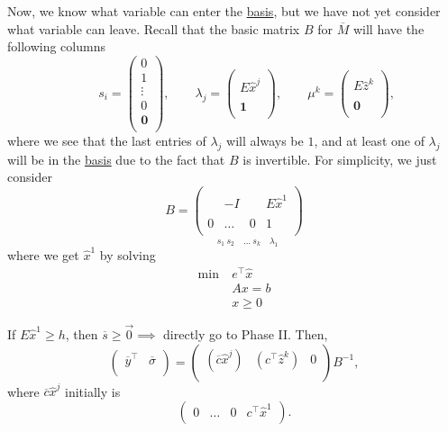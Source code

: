 Now, we know what variable can enter the \hyperref[def:basic]{basis}, but we have not yet consider what variable can leave. Recall that the basic matrix \(B\) for \(\overline{M}\)
will have the following columns
\[
	\qquad s_{i} = \begin{pmatrix}
		0      \\
		1      \\
		\vdots \\
		0      \\
		\bm{0} \\
	\end{pmatrix}, \qquad \lambda_{j} = \begin{pmatrix}
		\\
		E \hat{x}^j \\
		\\
		\bm{1}      \\
	\end{pmatrix}, \qquad \mu^k =\begin{pmatrix}
		\\
		E \hat{z}^k \\
		\\
		\bm{0}      \\
	\end{pmatrix},
\]
where we see that the last entries of \(\lambda_{j}\) will always be \(1\), and at least one of \(\lambda_{j}\) will be in the \hyperref[def:basic]{basis} due to the fact
that \(B\) is invertible. For simplicity, we just consider
\[
	B = \underset{s_1\ s_2\quad \ldots\ s_k\quad \lambda_1}{
		\begin{pmatrix}
			  &        &   &             \\
			  & -I     &   & E \hat{x}^1 \\
			  &        &   &             \\
			0 & \ldots & 0 & 1           \\
		\end{pmatrix}}
\]
where we get \(\hat{x}^1\) by solving
\begin{align*}
	\min~ & e^{\top}\hat{x} \\
	      & Ax = b          \\
	      & x\geq 0
\end{align*}

If \(E \hat{x}^1\geq h\), then \(\overline{s}\geq \vec{0}\implies\) directly go to Phase II. Then,
\[
	\begin{pmatrix}
		\overline{y}^{\top} & \overline{\sigma} \\
	\end{pmatrix} = \begin{pmatrix}
		(\overline{c}\hat{x}^j) & (c^{\top}\hat{z}^k) & 0 \\
	\end{pmatrix}B^{-1},
\]
where \(\overline{c}\hat{x}^j\) initially is
\[
	\begin{pmatrix}
		0 & \ldots & 0 & c^{\top}\hat{x}^1 \\
	\end{pmatrix}.
\]

